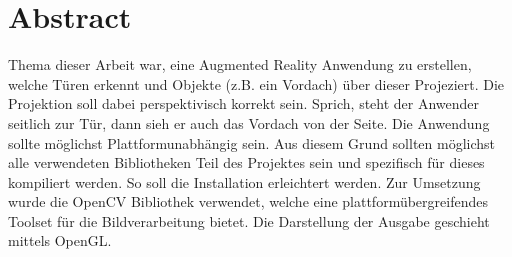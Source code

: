 \chapter{Abstract}
Thema dieser Arbeit war, eine Augmented Reality Anwendung zu erstellen, welche Türen erkennt und Objekte (z.B. ein Vordach) über dieser Projeziert. Die Projektion soll dabei perspektivisch korrekt sein. Sprich, steht der Anwender seitlich zur Tür, dann sieh er auch das Vordach von der Seite. Die Anwendung sollte möglichst Plattformunabhängig sein. Aus diesem Grund sollten möglichst alle verwendeten Bibliotheken Teil des Projektes sein und spezifisch für dieses kompiliert werden. So soll die Installation erleichtert werden. Zur Umsetzung wurde die OpenCV Bibliothek verwendet, welche eine plattformübergreifendes Toolset für die Bildverarbeitung bietet. Die Darstellung der Ausgabe geschieht mittels OpenGL.